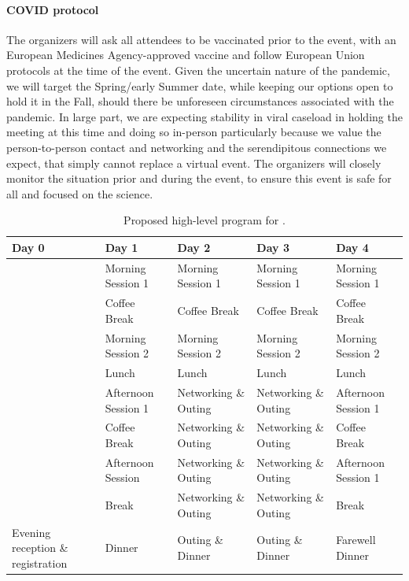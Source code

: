 \paragraph{COVID protocol} The organizers will ask all attendees to be
vaccinated prior to the event, with an European Medicines
Agency-approved vaccine and follow European Union protocols at the time
of the event. Given the uncertain nature of the pandemic, we will target
the Spring/early Summer date, while keeping our options open to hold it
in the Fall, should there be unforeseen circumstances associated with
the pandemic. In large part, we are expecting stability in viral
caseload in holding the meeting at this time and doing so in-person
particularly because we value the person-to-person contact and
networking and the serendipitous connections we expect, that simply
cannot replace a virtual event. The organizers will closely monitor the
situation prior and during the event, to ensure this event is safe for
all and focused on the science.

\begin{table}[!t]
  \centering
  \begin{tabular}{|p{2.5cm}|p{2.5cm}|p{2.5cm}|p{2.5cm}|p{2.5cm}|}
    \hline 
    \rowcolor{Gray}
    \bfseries Day 0& \bfseries Day 1&\bfseries Day 2 &\bfseries Day 3 &\bfseries Day 4\\
    \hline
                   &Morning Session 1&Morning Session 1&Morning Session 1&Morning Session 1\\
    \hline
                   &Coffee Break&Coffee Break&Coffee Break&Coffee Break\\
    \hline    
                   &Morning Session 2&Morning Session 2&Morning Session 2&Morning Session 2\\
    \hline
                   &Lunch&Lunch&Lunch&Lunch\\
    \hline
                   &Afternoon Session 1&Networking \& Outing&Networking \& Outing&Afternoon Session 1\\
    \hline
                   &Coffee Break&Networking \& Outing&Networking \& Outing&Coffee Break\\
    \hline
                   &Afternoon Session &Networking \& Outing&Networking \& Outing&Afternoon Session 1\\
    \hline
                   &Break&Networking \& Outing&Networking \& Outing&Break\\
    \hline
    Evening reception \& registration&Dinner&Outing \& Dinner&Outing \&
                                                               Dinner&Farewell Dinner\\
    \hline        
  \end{tabular}
  \caption{Proposed high-level program for \sympe.}
  \label{tab:symp}
\end{table}

